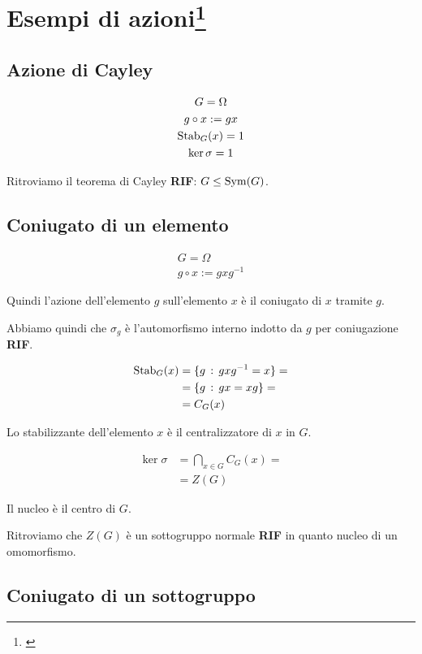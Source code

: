 \section[Esempi di azioni]{Esempi di azioni\footnote{\cite[8 novembre 2021]{lucchini}}}

\subsection{Azione di Cayley}

\begin{gather}
	G = \Omega \\
	g \circ x := gx \\
	\operatorname{Stab}_G(x) = 1 \\
	\ker \sigma = 1
\end{gather}

Ritroviamo il teorema di Cayley \textbf{RIF}: $G \le \operatorname{Sym}(G)$.

\subsection{Coniugato di un elemento}

\begin{gather}
	G = \Omega \\
	g \circ x := gxg^{-1}
\end{gather}

Quindi l'azione dell'elemento $g$ sull'elemento $x$ è il coniugato di $x$ tramite $g$.

Abbiamo quindi che $\sigma_g$ è l'automorfismo interno indotto da $g$ per coniugazione \textbf{RIF}.

\begin{align}
	\operatorname{Stab}_G(x) &= \{g \,:\, gxg^{-1} = x \} = \\\
	&= \{g \,:\, gx = xg \} = \\
	&= C_G(x)
\end{align}

Lo stabilizzante dell'elemento $x$ è il centralizzatore di $x$ in $G$.

\begin{align}
	\ker \sigma &= \bigcap_{x \in G} C_G(x) = \\
	&= Z(G)
\end{align}

Il nucleo è il centro di $G$.

Ritroviamo che $Z(G)$ è un sottogruppo normale \textbf{RIF} in quanto nucleo di un omomorfismo.

\subsection{Coniugato di un sottogruppo}


